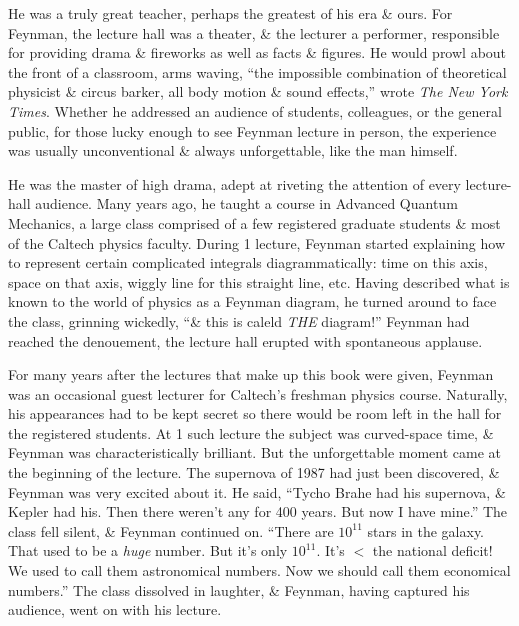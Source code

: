 \documentclass{article}
\begin{document}
He was a truly great teacher, perhaps the greatest of his era \& ours. For {\sc Feynman}, the lecture hall was a theater, \& the lecturer a performer, responsible for providing drama \& fireworks as well as facts \& figures. He would prowl about the front of a classroom, arms waving, ``the impossible combination of theoretical physicist \& circus barker, all body motion \& sound effects,'' wrote {\it The New York Times}. Whether he addressed an audience of students, colleagues, or the general public, for those lucky enough to see {\sc Feynman} lecture in person, the experience was usually unconventional \& always unforgettable, like the man himself.

He was the master of high drama, adept at riveting the attention of every lecture-hall audience. Many years ago, he taught a course in Advanced Quantum Mechanics, a large class comprised of a few registered graduate students \& most of the Caltech physics faculty. During 1 lecture, {\sc Feynman} started explaining how to represent certain complicated integrals diagrammatically: time on this axis, space on that axis, wiggly line for this straight line, etc. Having described what is known to the world of physics as a {\sc Feynman} diagram, he turned around to face the class, grinning wickedly, ``\& this is caleld {\it THE} diagram!'' {\sc Feynman} had reached the denouement, the lecture hall erupted with spontaneous applause.

For many years after the lectures that make up this book were given, {\sc Feynman} was an occasional guest lecturer for Caltech's freshman physics course. Naturally, his appearances had to be kept secret so there would be room left in the hall for the registered students. At 1 such lecture the subject was curved-space time, \& {\sc Feynman} was characteristically brilliant. But the unforgettable moment came at the beginning of the lecture. The supernova of 1987 had just been discovered, \& {\sc Feynman} was very excited about it. He said, ``Tycho Brahe had his supernova, \& Kepler had his. Then there weren't any for 400 years. But now I have mine.'' The class fell silent, \& {\sc Feynman} continued on. ``There are $10^{11}$ stars in the galaxy. That used to be a {\it huge} number. But it's only $10^{11}$. It's $<$ the national deficit! We used to call them astronomical numbers. Now we should call them economical numbers.'' The class dissolved in laughter, \& {\sc Feynman}, having captured his audience, went on with his lecture.
\end{document}
